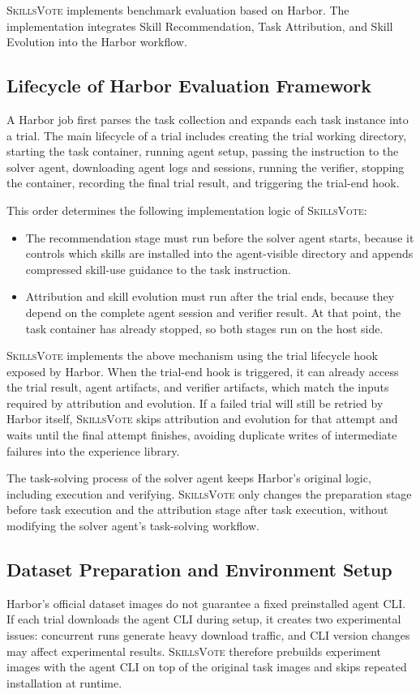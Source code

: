 \documentclass{llmxive}
\providecommand{\ours}{\textsc{SkillsVote}\xspace}
\begin{document}
\ours implements benchmark evaluation based on Harbor. The implementation integrates Skill Recommendation, Task Attribution, and Skill Evolution into the Harbor workflow.

\subsection{Lifecycle of Harbor Evaluation Framework}
A Harbor job first parses the task collection and expands each task instance into a trial. The main lifecycle of a trial includes creating the trial working directory, starting the task container, running agent setup, passing the instruction to the solver agent, downloading agent logs and sessions, running the verifier, stopping the container, recording the final trial result, and triggering the trial-end hook.

This order determines the following implementation logic of \ours:
\begin{itemize}
    \item The recommendation stage must run before the solver agent starts, because it controls which skills are installed into the agent-visible directory and appends compressed skill-use guidance to the task instruction.
    \item Attribution and skill evolution must run after the trial ends, because they depend on the complete agent session and verifier result. At that point, the task container has already stopped, so both stages run on the host side.
\end{itemize}

\ours implements the above mechanism using the trial lifecycle hook exposed by Harbor. When the trial-end hook is triggered, it can already access the trial result, agent artifacts, and verifier artifacts, which match the inputs required by attribution and evolution. If a failed trial will still be retried by Harbor itself, \ours skips attribution and evolution for that attempt and waits until the final attempt finishes, avoiding duplicate writes of intermediate failures into the experience library.

The task-solving process of the solver agent keeps Harbor's original logic, including execution and verifying. \ours only changes the preparation stage before task execution and the attribution stage after task execution, without modifying the solver agent's task-solving workflow.

\subsection{Dataset Preparation and Environment Setup}
Harbor's official dataset images do not guarantee a fixed preinstalled agent CLI. If each trial downloads the agent CLI during setup, it creates two experimental issues: concurrent runs generate heavy download traffic, and CLI version changes may affect experimental results. \ours therefore prebuilds experiment images with the agent CLI on top of the original task images and skips repeated installation at runtime.
\end{document}
